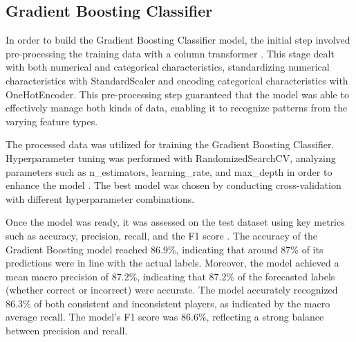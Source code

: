 \documentclass[12pt, a4paper,oneside]{book}
\numberwithin{equation}{section}
\begin{document}
\subsection{Gradient Boosting Classifier}\label{sec:4.4.3}

In order to build the Gradient Boosting Classifier model, the initial step involved pre-processing the training data with a column transformer \cite{friedman2001} \cite{Kaggle2021}. This stage dealt with both numerical and categorical characteristics, standardizing numerical characteristics with StandardScaler and encoding categorical characteristics with OneHotEncoder. This pre-processing step guaranteed that the model was able to effectively manage both kinds of data, enabling it to recognize patterns from the varying feature types.

The processed data was utilized for training the Gradient Boosting Classifier. Hyperparameter tuning was performed with RandomizedSearchCV, analyzing parameters such as n\_estimators, learning\_rate, and max\_depth in order to enhance the model \cite{chen2016}. The best model was chosen by conducting cross-validation with different hyperparameter combinations.

Once the model was ready, it was assessed on the test dataset using key metrics such as accuracy, precision, recall, and the F1 score \cite{sokolova2009}. The accuracy of the Gradient Boosting model reached 86.9\%, indicating that around 87\% of its predictions were in line with the actual labels. Moreover, the model achieved a mean macro precision of 87.2\%, indicating that 87.2\% of the forecasted labels (whether correct or incorrect) were accurate. The model accurately recognized 86.3\% of both consistent and inconsistent players, as indicated by the macro average recall. The model's F1 score was 86.6\%, reflecting a strong balance between precision and recall.
\begin{table}[ht]
    \centering
    \caption{Confusion Matrix for Gradient Boosting Classifier}
\end{table}
\end{document}
